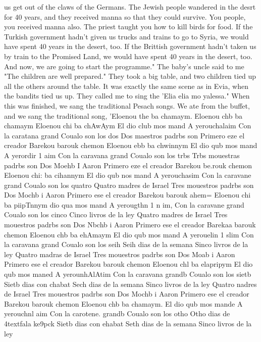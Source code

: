 {us get out of the claws of the Germans. The Jewish people wandered in the desrt for 40 
years, and they received manna so that they could survive. You people, you received manna 
also. The priest taught you how to kill birds for food. If the Turkish government hadn't 
given us trucks and trains to go to Syria, we would have spent 40 years in the desert, too. 
If the Brittish government hadn't taken us by train to the Promised Land, we would have 
spent 40 years in the desert, too. And now, we are going to start the programme." 
The baby's uncle said to me "The children are well prepared." They took a big table, 
and two children tied up all the others around the table. It was exactly the same scene 
as in Evia, when the bandits tied us up. They called me to sing the 'Elia elia mo yalessa." 
When this was finished, we sang the traditional Pesach songs. We ate from the buffet, 
and we sang the traditional song, 'Eloenou the ba chamaym. 
Eloenou chb ba chamaym 
Eloenou chi ba chAwAym 
El dio club mos mand 
A yerouchalaim 
Con la caratana grand 
Coualo son los dos 
Dos maestros padrbs son 
Primero eze el creador 
Barekou barouk chemon 
Eloenou ebb ba chwinnym 
El dio qub mos mand 
A yerordir 1 aim 
Con la caravana grand 
Coualo son los trbs 
Trbs mouestras padrbs son 
Dos Moehb I Aaron 
Primero eze el creador 
Barekou be.rouk chemon 
Eloenou chi: ba cihannym 
El dio qub nos mand 
A yerouchasim 
Con la caravane grand 
Coualo son los quatro 
Quatro madres de Israel 
Tres mouestros padrbs son 
Dos Mochb i Aaron 
Primero ese el creador 
Barekou barouk ahem= 
Eloenou chi ba piipTnnym 
dio qua mos mand 
A yerougthn 1 n im, 
Con la caravane grand 
Coualo son los cinco 
Cinco livros de la ley 
Quatro madres de Israel 
Tres mouestros padrbs son 
Dos Nbchb i Aaron 
Primero ese el creador 
Barekaa barouk chemon 
Eloenou chb ba ehAmaym 
El dio qub mos mand 
A yerouelin 1 slim 
Con la caravana grand 
Coualo son los seih 
Seih dias de la semana 
Sinco livros de la ley 
Quatro madras de Israel 
Tres mouestros padrbs son 
Dos Moab i Aaron 
Primero ese el creador 
Barekou barouk chemon 
Eloenou chl ba elapripym 
El dio qub mos maned 
A yerounhAlAtim 
Con la caravana grandb 
Coualo son los sietb 
Sietb dias con chabat 
Sech dias de la semana 
Sinco livros de la ley 
Quatro nadres de Israel 
Tres mouestros padrbs son 
Dos Mochb i Aaron 
Primero ese el creador 
Barekou barouk chemon 
Eloenou chb ba chamaym. 
El dio qub mos mande 
A yerouchnl aim 
Con la carotene. grandb 
Coualo son los otho 
Otho dias de 4textfala ke9pck 
Sietb dias con ehabat 
Seth dias de la semana 
Sinco livros de la ley 
}
